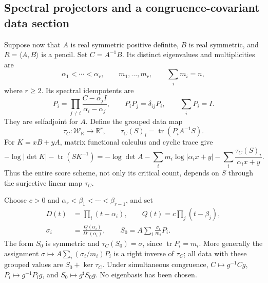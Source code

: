 \subsection{Spectral projectors and a congruence-covariant data section}
Suppose now that \(A\) is real symmetric positive definite, \(B\)
is real symmetric, and \(R=\langle A,B\rangle\) is a pencil.
Set \(C=A^{-1}B\).  Its distinct eigenvalues and multiplicities are
\[
        \alpha_1<\cdots<\alpha_r,\qquad m_1,\ldots,m_r,
        \qquad \sum_i m_i=n,
\]
where \(r\ge2\).  Its spectral idempotents are
\begin{equation}\label{eq:spectral-projectors-v143}
 P_i=\prod_{j\ne i}\frac{C-\alpha_j I}{\alpha_i-\alpha_j},
 \qquad P_iP_j=\delta_{ij}P_i,\qquad \sum_iP_i=I.
\end{equation}
They are selfadjoint for \(A\).  Define the grouped data map
\begin{equation}\label{eq:group-trace-v143}
 \tau_C:\mathcal W_{\mathbb R}\longrightarrow\mathbb R^r,
 \qquad \tau_C(S)_i=\operatorname{tr}(P_iA^{-1}S).
\end{equation}
For \(K=xB+yA\), matrix functional calculus and cyclic trace give
\begin{equation}\label{eq:matrix-grouped-likelihood-v143}
 -\log|\det K|-\operatorname{tr}(SK^{-1})
 =-\log\det A-\sum_i m_i\log|\alpha_i x+y|
                    -\sum_i\frac{\tau_C(S)_i}{\alpha_i x+y}.
\end{equation}
Thus the entire score scheme, not only its critical count, depends
on \(S\) through the surjective linear map \(\tau_C\).

Choose \(c>0\) and
\(\alpha_r<\beta_1<\cdots<\beta_{r-1}\), and set
\begin{equation}\label{eq:residue-data-section-v143}
 \begin{split}
 D(t)&=\prod_i(t-\alpha_i),\qquad Q(t)=c\prod_j(t-\beta_j),\\
 \sigma_i&=\frac{Q(\alpha_i)}{D'(\alpha_i)},\qquad
 S_0=A\sum_i\frac{\sigma_i}{m_i}P_i.
 \end{split}
\end{equation}
The form \(S_0\) is symmetric and \(\tau_C(S_0)=\sigma\), since
\(\operatorname{tr}P_i=m_i\).  More generally the assignment
\(\sigma\mapsto A\sum_i(\sigma_i/m_i)P_i\) is a right inverse
of \(\tau_C\); all data with these grouped values are
\(S_0+\ker\tau_C\).  Under simultaneous congruence,
\(C\mapsto g^{-1}Cg\), \(P_i\mapsto g^{-1}P_i g\), and
\(S_0\mapsto g^{\mathsf t}S_0g\).  No eigenbasis has been chosen.

